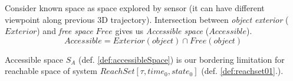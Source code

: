 \begin{definition}\label{def:accessibleSpace}
    Consider known space as space explored by sensor (it can have different viewpoint along previous 3D trajectory).
    Intersection between \textit{object exterior} ($Exterior$) and \textit{free space} $Free$ gives us \textit{Accessible space} ($Accessible$).
    \begin{equation}
        Accessible = Exterior(object) \cap Free(object)
    \end{equation}
\end{definition}
 
 \noindent Accessible space $S_A$ (def. \ref{def:accessibleSpace}) is our bordering limitation for reachable space of system $ReachSet[\tau, time_0, state_0]$ (def. \ref{def:reachset01}.).